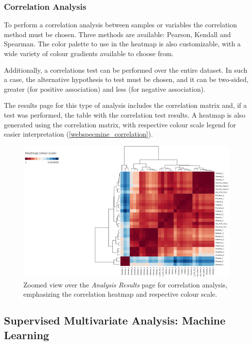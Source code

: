 \subsubsection{Correlation Analysis}

To perform a correlation analysis between samples or variables the correlation method must be chosen. Three methods are available: Pearson, Kendall and Spearman. The color palette to use in the heatmap is also customizable, with a wide variety of colour gradients available to choose from.

Additionally, a correlations test can be performed over the entire dataset. In such a case, the alternative hypothesis to test must be chosen, and it can be two-sided, greater (for positive association) and less (for negative association).

The results page for this type of analysis includes the correlation matrix and, if a test was performed, the table with the correlation test results. A heatmap is also generated using the correlation matrix, with respective colour scale legend for easier interpretation (\autoref{webspecmine_correlation}).

\begin{figure}[h]
	\centering
	\includegraphics[width=1\linewidth]{Imagens/webspecmine_correlation}
	\caption{Zoomed view over the \textit{Analysis Results} page for correlation analysis, emphasizing the correlation heatmap and respective colour scale.}
	\label{webspecmine_correlation}
\end{figure}



\subsection{Supervised Multivariate Analysis: Machine Learning}

